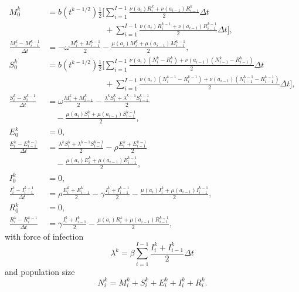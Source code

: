 \documentclass{jpmarticle}
\begin{document}
\begin{equation}
  \begin{split}
    M_0^k &=
    b(t^{k - 1 / 2})
    \frac{1}{2}
    \Bigg[
    \sum_{i = 1}^{I - 1}
    \frac{\nu(a_i) R_i^k + \nu(a_{i - 1}) R_{i - 1}^k}{2}
    \Delta t
    \\ & \quad\quad\quad\quad\quad\quad\quad {}
    + \sum_{i = 1}^{I - 1}
    \frac{\nu(a_i) R_i^{k - 1} + \nu(a_{i - 1}) R_{i - 1}^{k - 1}}{2}
    \Delta t
    \Bigg],
    \\
    \frac{M_i^k - M_{i - 1}^{k - 1}}{\Delta t} &=
    - \omega \frac{M_i^k + M_{i - 1}^{k - 1}}{2}
    - \frac{\mu(a_i) M_i^k + \mu(a_{i - 1}) M_{i - 1}^{k - 1}}{2},
    \\
    S_0^k &=
    b(t^{k - 1 / 2})
    \frac{1}{2}
    \Bigg[
    \sum_{i = 1}^{I - 1}
    \frac{\nu(a_i) (N_i^k - R_i^k)
      + \nu(a_{i - 1}) (N_{i - 1}^k - R_{i - 1}^k)}
    {2}
    \Delta t
    \\ & \quad\quad\quad\quad\quad\quad\quad {}
    + \sum_{i = 1}^{I - 1}
    \frac{\nu(a_i) (N_i^{k - 1} - R_i^{k - 1})
      + \nu(a_{i - 1}) (N_{i - 1}^{k - 1} - R_{i - 1}^{k - 1})}
    {2}
    \Delta t
    \Bigg],
    \\
    \frac{S_i^k - S_i^{k - 1}}{\Delta t} &=
    \omega \frac{M_i^k + M_{i - 1}^k}{2}
    - \frac{\lambda^k S_i^k + \lambda^{k - 1} S_{i - 1}^{k - 1}}{2}
    \\ & \quad {}
    - \frac{\mu(a_i) S_i^k + \mu(a_{i - 1}) S_{i - 1}^{k - 1}}{2},
    \\
    E_0^k &= 0,
    \\
    \frac{E_i^k - E_{i - 1}^{k - 1}}{\Delta t} &=
    \frac{\lambda^k S_i^k + \lambda^{k - 1} S_{i - 1}^{k - 1}}{2}
    - \rho \frac{E_i^k + E_{i - 1}^{k - 1}}{2}
    \\ & \quad {}
    - \frac{\mu(a_i) E_i^k + \mu(a_{i - 1}) E_{i - 1}^{k - 1}}{2},
    \\
    I_0^k &= 0,
    \\
    \frac{I_i^k - I_{i - 1}^{k - 1}}{\Delta t} &=
    \rho \frac{E_i^k + E_{i - 1}^k}{2}
    - \gamma \frac{I_i^k + I_{i - 1}^{k - 1}}{2}
    - \frac{\mu(a_i) I_i^k + \mu(a_{i - 1}) I_{i - 1}^{k - 1}}{2},
    \\
    R_0^k &= 0,
    \\
    \frac{R_i^k - R_i^{k - 1}}{\Delta t} &=
    \gamma \frac{I_i^k + I_{i - 1}^k}{2}
    - \frac{\mu(a_i) R_i^k + \mu(a_{i - 1}) R_{i - 1}^{k - 1}}{2},
  \end{split}
\end{equation}
with force of infection
\begin{equation}
  \lambda^k =
  \beta \sum_{i = 1}^{I - 1}
  \frac{I_i^k + I_{i - 1}^k}{2}
  \Delta t
\end{equation}
and population size
\begin{equation}
  N_i^k =
  M_i^k + S_i^k + E_i^k + I_i^k + R_i^k.
\end{equation}
\end{document}
